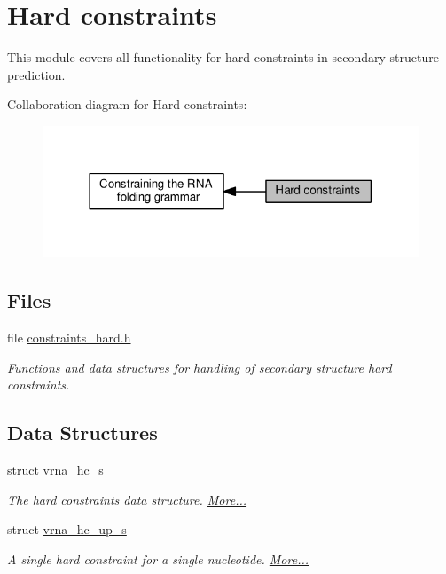 \hypertarget{group__hard__constraints}{}\section{Hard constraints}
\label{group__hard__constraints}


This module covers all functionality for hard constraints in secondary structure prediction.  


Collaboration diagram for Hard constraints\+:
\nopagebreak
\begin{figure}[H]
\begin{center}
\leavevmode
\includegraphics[width=318pt]{group__hard__constraints}
\end{center}
\end{figure}
\subsection*{Files}
\begin{DoxyCompactItemize}
\item 
file \hyperlink{constraints__hard_8h}{constraints\+\_\+hard.\+h}
\begin{DoxyCompactList}\small\item\em Functions and data structures for handling of secondary structure hard constraints. \end{DoxyCompactList}\end{DoxyCompactItemize}
\subsection*{Data Structures}
\begin{DoxyCompactItemize}
\item 
struct \hyperlink{group__hard__constraints_structvrna__hc__s}{vrna\+\_\+hc\+\_\+s}
\begin{DoxyCompactList}\small\item\em The hard constraints data structure.  \hyperlink{group__hard__constraints_structvrna__hc__s}{More...}\end{DoxyCompactList}\item 
struct \hyperlink{group__hard__constraints_structvrna__hc__up__s}{vrna\+\_\+hc\+\_\+up\+\_\+s}
\begin{DoxyCompactList}\small\item\em A single hard constraint for a single nucleotide.  \hyperlink{group__hard__constraints_structvrna__hc__up__s}{More...}\end{DoxyCompactList}\end{DoxyCompactItemize}
